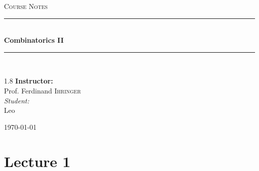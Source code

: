 \documentclass[11pt, a4paper]{ctexrep}
\newcommand{\HRule}[1]{\rule{\linewidth}{#1}}
\begin{document}
\hypersetup{pageanchor=false}
\begin{titlepage}
    \centering
    \vspace*{2cm}

    \textsc{\Large Course Notes}\\[0.5cm]

    \HRule{1.5pt} \\[0.5cm]
    { \huge \bfseries Combinatorics II }\\[0.4cm]
    \HRule{1.5pt} \\[1.5cm]

    \vspace{3cm}

    \begin{spacing}{1.8}
        {\Large \textbf{Instructor:}} \\
        {\Large Prof. Ferdinand \textsc{Ihringer}} \\[0.8cm]

        {\normalsize \textit{Student:}} \\
        {\normalsize Leo}
    \end{spacing}

    \vfill
    {\large \today}
\end{titlepage}
\hypersetup{pageanchor=true}
\newpage
\tableofcontents
\newpage


\chapter{Lecture 1}
\end{document}
